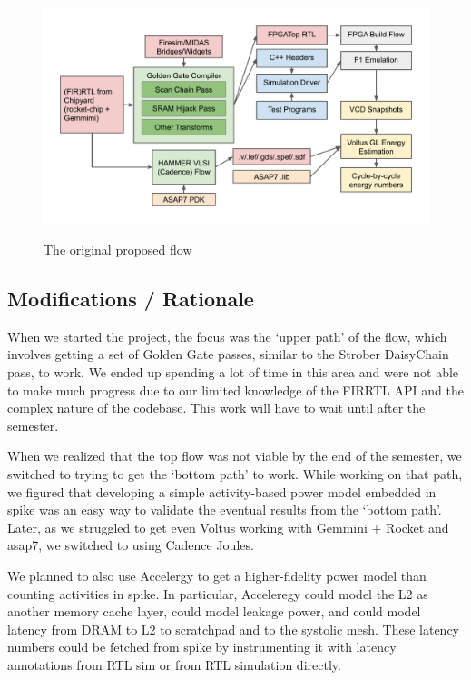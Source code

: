 \documentclass[sigconf]{acmart}
\begin{document}
\begin{figure}
  \centering
  \includegraphics[width=\linewidth]{original_proposal.pdf}
  \label{fig:orignal_proposal}
  \caption{The original proposed flow}
\end{figure}

\subsection{Modifications / Rationale}
When we started the project, the focus was the `upper path' of the flow, which involves getting a set of Golden Gate passes, similar to the Strober DaisyChain pass, to work.
We ended up spending a lot of time in this area and were not able to make much progress due to our limited knowledge of the FIRRTL API and the complex nature of the codebase.
This work will have to wait until after the semester.

When we realized that the top flow was not viable by the end of the semester, we switched to trying to get the `bottom path' to work.
While working on that path, we figured that developing a simple activity-based power model embedded in spike was an easy way to validate the eventual results from the `bottom path'.
Later, as we struggled to get even Voltus working with Gemmini + Rocket and asap7, we switched to using Cadence Joules.

We planned to also use Accelergy to get a higher-fidelity power model than counting activities in spike.
In particular, Acceleregy could model the L2 as another memory cache layer, could model leakage power, and could model latency from DRAM to L2 to scratchpad and to the systolic mesh.
These latency numbers could be fetched from spike by instrumenting it with latency annotations from RTL sim or from RTL simulation directly.
\end{document}
